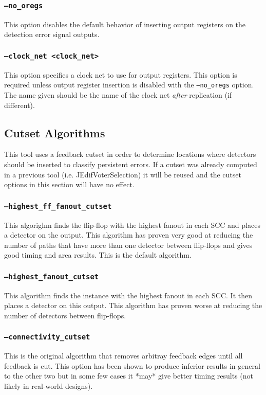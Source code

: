 \subsubsection{\texttt{--no\_oregs}}
This option disables the default behavior of inserting output registers on the
detection error signal outputs.

\subsubsection{\texttt{--clock\_net <clock\_net>}}
This option specifies a clock net to use for output registers. This option is
required unless output register insertion is disabled with the
\texttt{--no\_oregs} option. The name given should be the name of the clock net
\emph{after} replication (if different).

\subsection{Cutset Algorithms}
This tool uses a feedback cutset in order to determine locations where
detectors should be inserted to classify persistent errors. If a cutset was
already computed in a previous tool (i.e. JEdifVoterSelection) it will be
reused and the cutset options in this section will have no effect.

\subsubsection{\texttt{--highest\_ff\_fanout\_cutset}}
This algorighm finds the flip-flop with the highest fanout in each SCC and 
places a detector on the output. This algorithm has proven very good at reducing 
the number of paths that have more than one detector between flip-flops and
gives good timing and area results. This is the default algorithm.

\subsubsection{\texttt{--highest\_fanout\_cutset}}
This algorithm finds the instance with the highest fanout in each SCC.
It then places a detector on this output. This algorithm has proven worse 
at reducing the number of detectors between flip-flops.

\subsubsection{\texttt{--connectivity\_cutset}}
This is the original algorithm that removes arbitray feedback edges until all
feedback is cut. This option has been shown to produce inferior results in
general to the other two but in some few cases it *may* give better timing
results (not likely in real-world designs).




